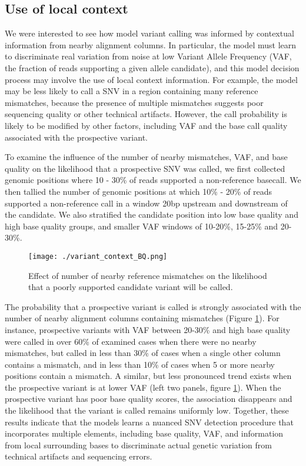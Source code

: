 \documentclass[]{article}
\begin{document}
\subsection{Use of local context}
 
We were interested to see how model variant calling was informed by contextual information from nearby alignment columns. In particular, the model must learn to discriminate real variation from noise at low Variant Allele Frequency (VAF, the fraction of reads supporting a given allele candidate), and this model decision process may involve the use of local context information. For example, the model may be less likely to call a SNV in a region containing many reference mismatches, because the presence of multiple mismatches suggests poor sequencing quality or other technical artifacts. However, the call probability is likely to be modified by other factors, including VAF and the base call quality associated with the prospective variant.   

To examine the influence of the number of nearby mismatches, VAF, and base quality on the likelihood that a prospective SNV was called, we first collected genomic positions where 10 - 30\% of reads supported a non-reference basecall. We then tallied the number of genomic positions at which 10\% - 20\% of reads supported a non-reference call in a window 20bp upstream and downstream of the candidate. We also stratified the candidate position into low base quality and high base quality groups, and smaller VAF windows of 10-20\%, 15-25\% and 20-30\%.  

\begin{figure}[htp]
	\texttt{[image: ./variant\_context\_BQ.png]}
	\caption{ Effect of number of nearby reference mismatches on the likelihood that a poorly supported candidate variant will be called. }
	\label{fig:variant_context}
\end{figure}

The probability that a prospective variant is called is strongly associated with the number of nearby alignment columns containing mismatches (Figure \ref{fig:variant_context}). For instance, prospective variants with VAF between 20-30\% and high base quality were called in over 60\% of examined cases when there were no nearby mismatches, but called in less than 30\% of cases when a single other column contains a mismatch, and in less than 10\% of cases when 5 or more nearby positions contain a mismatch. A similar, but less pronounced trend exists when the prospective variant is at lower VAF (left two panels, figure \ref{fig:variant_context}). When the prospective variant has poor base quality scores, the association disappears and the likelihood that the variant is called remains uniformly low. Together, these results indicate that the models learns a nuanced SNV detection procedure that incorporates multiple elements, including base quality, VAF, and information from local surrounding bases to discriminate actual genetic variation from technical artifacts and sequencing errors.   
\end{document}
